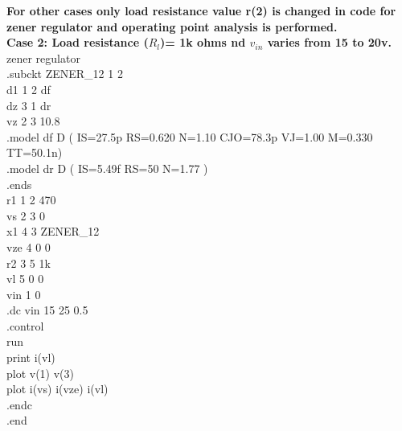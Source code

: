 \documentclass[12pt]{article}
\begin{document}
\textbf{For other cases only load resistance value r(2) is changed in code for zener regulator and operating point analysis is performed.\\}
\newpage
\textbf{Case 2: Load resistance (\(R_{l}\))= 1k ohms nd \(v_{in}\) varies from 15 to 20v.\\}
zener regulator\\
.subckt ZENER\_12 1 2\\
d1 1 2 df\\
dz 3 1 dr\\
vz 2 3 10.8\\
.model df D ( IS=27.5p RS=0.620 N=1.10 CJO=78.3p VJ=1.00 M=0.330 TT=50.1n)\\
.model dr D ( IS=5.49f RS=50 N=1.77 )\\
.ends\\
r1  1 2 470\\
vs 2 3 0\\
x1 4 3 ZENER\_12\\
vze 4 0 0\\
r2 3 5 1k\\
vl 5 0 0\\
vin 1 0 \\
.dc vin 15 25 0.5\\
.control\\
run\\
print i(vl)\\
plot v(1) v(3)\\ 
plot i(vs) i(vze) i(vl)\\
.endc\\
.end\\
\newpage
\end{document}
